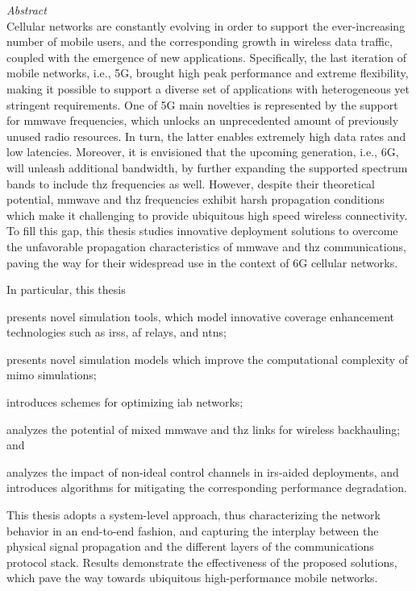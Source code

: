 {\noindent\huge\itshape Abstract}\\
%

Cellular networks are constantly evolving in order to support the ever-increasing number of mobile users, and the corresponding growth in wireless data traffic, coupled with the emergence of new applications. 
Specifically, the last iteration of mobile networks, i.e., 5G, brought high peak performance and extreme flexibility, making it possible to support a diverse set of applications with heterogeneous yet stringent requirements. 
One of 5G main novelties is represented by the support for \gls{mmwave} frequencies, which unlocks an unprecedented amount of previously unused radio resources. In turn, the latter enables extremely high data rates and low latencies. Moreover, it is envisioned that the upcoming generation, i.e., 6G, will unleash additional bandwidth, by further expanding the supported spectrum bands to include \gls{thz} frequencies as well. 
However, despite their theoretical potential, \gls{mmwave} and \gls{thz} frequencies exhibit harsh propagation conditions which make it challenging to provide ubiquitous high speed wireless connectivity. 
To fill this gap, this thesis studies innovative deployment solutions to overcome the unfavorable propagation characteristics of \gls{mmwave} and \gls{thz} communications, paving the way for their widespread use in the context of 6G cellular networks. 

In particular, this thesis
\begin{enumerate*}[label=(\roman*)]
    \item presents novel simulation tools, which model innovative coverage enhancement technologies such as \glspl{irs}, \gls{af} relays, and \glspl{ntn};
    \item presents novel simulation models which improve the computational complexity of \gls{mimo} simulations;
    \item introduces schemes for optimizing \gls{iab} networks;
    \item analyzes the potential of mixed \gls{mmwave} and \gls{thz} links for wireless backhauling; and
    \item analyzes the impact of non-ideal control channels in \gls{irs}-aided deployments, and introduces algorithms for mitigating the corresponding performance degradation.
\end{enumerate*}

This thesis adopts a system-level approach, thus characterizing the network behavior in an end-to-end fashion, and capturing the interplay between the physical signal propagation and the different layers of the communications protocol stack. Results demonstrate the effectiveness of the proposed solutions, which pave the way towards ubiquitous high-performance mobile networks.